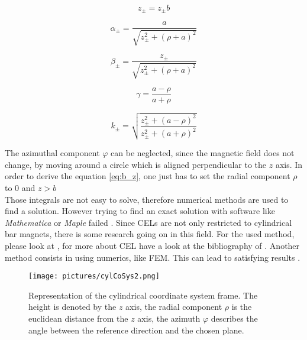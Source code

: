 \begin{equation}
z_{\pm} = z_{\pm} b
\end{equation}

\begin{equation}
\alpha_{\pm} = \frac{a}{\sqrt{z_{\pm}^2+(\rho+a)^2}}
\end{equation}

\begin{equation}
\beta_{\pm} = \frac{z_{\pm}}{\sqrt{z_{\pm}^2+(\rho+a)^2}}
\end{equation}

\begin{equation}
\gamma = \frac{a-\rho}{a+\rho}
\end{equation}

\begin{equation}
k_{\pm} = \sqrt{\frac{z_{\pm}^2 + (a-\rho)^2}{z_{\pm}^2 + (a+\rho)^2}}
\end{equation}

The azimuthal component $ \varphi $ can be neglected, since the magnetic field does not change, by moving around a circle which is aligned perpendicular to the $ z $ axis. In order to derive the equation \ref{eq:b_z}, one just has to set the radial component $ \rho $ to 0 and $ z > b $\\
Those integrals are not easy to solve, therefore numerical methods are used to find a solution. However trying to find an exact solution with software like \textit{Mathematica} or \textit{Maple} failed \cite{camacho2013alternative}. Since \acp{CEL} are not only restricted to cylindrical bar magnets, there is some research going on in this field. For the used method, please look at , for more about \ac{CEL} have a look at the bibliography of \cite{derby2010cylindrical}. Another method consists in using numerics, like \ac{FEM}. This can lead to satisfying results \cite{mladenovic2009magnetic}.

\begin{figure}
\centering
\texttt{[image: pictures/cylCoSys2.png]}
\label{fig:cylCoSys}
\caption{Representation of the cylindrical coordinate system frame. The height is denoted by the $ z $ axis, the radial component $ \rho $ is the euclidean distance from the $ z $ axis, the azimuth $ \varphi $ describes the angle between the reference direction and the chosen plane.}
\end{figure}


